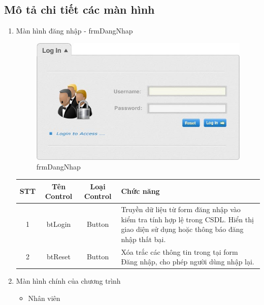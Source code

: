 \documentclass{article}
\begin{document}
	\newpage
	
	\subsection{Mô tả chi tiết các màn hình}
	
		\begin{enumerate}
			\item Màn hình đăng nhập - frmDangNhap
			
				\begin{figure}[!h]
					\includegraphics[width=\linewidth]{GUI/Login.jpg}
					\caption{frmDangNhap}
					\label{fig:frmDangNhap}
				\end{figure}
				
					
					\begin{tabular}{|c|c|c| p{5cm}|}
						
						\hline
						STT & Tên Control & Loại Control & Chức năng \\
						\hline
						1 & btLogin & Button & Truyền dữ liệu từ form đăng nhập vào kiểm tra tính hợp lệ trong CSDL. Hiển thị giao diện sử dụng hoặc thông báo đăng nhập thất bại.\\
						\hline
						2 & btReset & Button & Xóa trắc các thông tin trong tại form Đăng nhập, cho phép người dùng nhập lại. \\
						\hline
						
					\end{tabular}
				
			\newpage
			
			\item Màn hình chính của chương trình
			
				\begin{itemize}
					\item Nhân viên
					

\end{itemize}
\end{enumerate}
\end{document}
